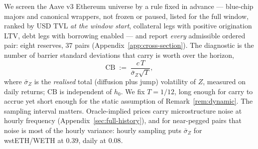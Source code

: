 \documentclass[11pt]{article}
\theoremstyle{plain}
\theoremstyle{definition}
\theoremstyle{remark}
\begin{document}
We screen the Aave v3 Ethereum universe by a rule fixed in advance --- blue-chip majors and canonical
wrappers, not frozen or paused, listed for the full window, ranked by USD TVL \emph{at the window
start}, collateral legs with positive origination LTV, debt legs with borrowing enabled --- and
report \emph{every} admissible ordered pair: eight reserves, $37$ pairs
(Appendix~\ref{app:cross-section}). The diagnostic is the number of barrier standard deviations that
carry is worth over the horizon,
\begin{equation}\label{eq:carry-ratio}
\mathrm{CB} \;:=\; \frac{c\,T}{\bar\sigma_Z\sqrt{T}},
\end{equation}
where $\bar\sigma_Z$ is the \emph{realised} total (diffusion plus jump) volatility of $Z$, measured
on daily returns; $\mathrm{CB}$ is independent of $h_0$. We fix $T=1/12$, long enough for carry to
accrue yet short enough for the static assumption of Remark~\ref{rem:dynamic}. The sampling
interval matters. Oracle-implied prices carry microstructure noise at hourly frequency
(Appendix~\ref{sec:full-history}), and for near-pegged pairs that noise is most of the hourly
variance: hourly sampling puts $\bar\sigma_Z$ for wstETH/WETH at $0.39$, daily at $0.08$.
\end{document}
